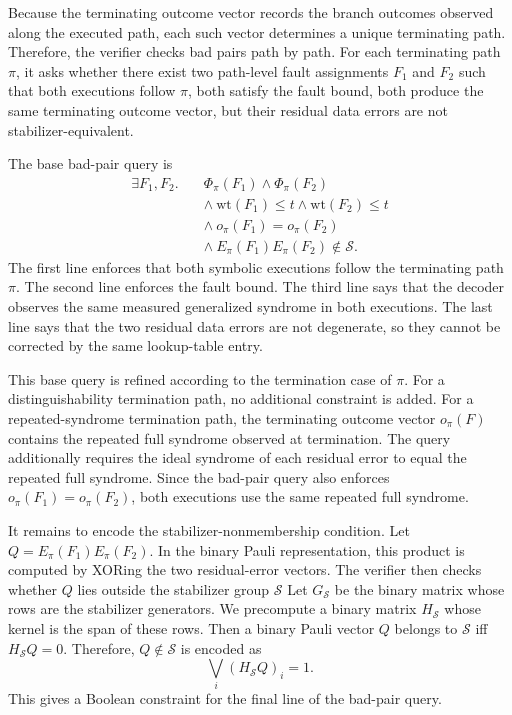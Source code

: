\documentclass[acmsmall,screen,review,anonymous,nonacm]{acmart}
\begin{document}
Because the terminating outcome vector records the branch outcomes observed along the executed path, each such vector determines a unique terminating path. Therefore, the verifier checks bad pairs path by path. For each terminating path $\pi$, it asks whether there exist two path-level fault assignments $F_1$ and $F_2$ such that both executions follow $\pi$, both satisfy the fault bound, both produce the same terminating outcome vector, but their residual data errors are not stabilizer-equivalent.

The base bad-pair query is
\[
\begin{aligned}
\exists F_1,F_2.\quad
&
\Phi_\pi(F_1)
\land
\Phi_\pi(F_2)
\\
&\land\ \mathrm{wt}(F_1)\le t
\land
\mathrm{wt}(F_2)\le t
\\
&\land\ o_\pi(F_1)=o_\pi(F_2)
\\
&\land\ E_\pi(F_1)E_\pi(F_2)\notin\mathcal{S}.
\end{aligned}
\]
The first line enforces that both symbolic executions follow the terminating path $\pi$. The second line enforces the fault bound. The third line says that the decoder observes the same measured generalized syndrome in both executions. The last line says that the two residual data errors are not degenerate, so they cannot be corrected by the same lookup-table entry.

This base query is refined according to the termination case of $\pi$. For a distinguishability termination path, no additional constraint is added. For a repeated-syndrome termination path, the terminating outcome vector $o_\pi(F)$ contains the repeated full syndrome observed at termination. The query additionally requires the ideal syndrome of each residual error to equal the repeated full syndrome. Since the bad-pair query also enforces $o_\pi(F_1)=o_\pi(F_2)$, both executions use the same repeated full syndrome.

It remains to encode the stabilizer-nonmembership condition. Let $Q=E_\pi(F_1)E_\pi(F_2)$. In the binary Pauli representation, this product is computed by XORing the two residual-error vectors. The verifier then checks whether $Q$ lies outside the stabilizer group $\mathcal{S}$
Let $G_{\mathcal S}$ be the binary matrix whose rows are the stabilizer generators. We precompute a binary matrix $H_{\mathcal S}$ whose kernel is the span of these rows. Then a binary Pauli vector $Q$ belongs to $\mathcal S$ iff
$H_{\mathcal S}Q=0$.
Therefore, $Q\notin\mathcal S$ is encoded as
\[
  \bigvee_i (H_{\mathcal S}Q)_i = 1 .
\]
This gives a Boolean constraint for the final line of the bad-pair query.
\end{document}

